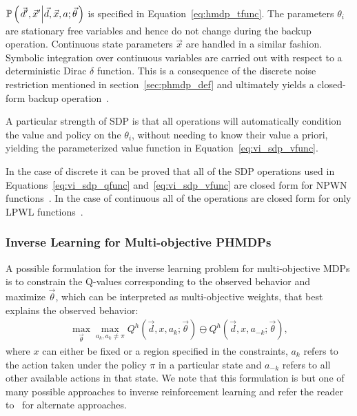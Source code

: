 {\footnotesize $\mathbb{P}\left({\left. \vec{d}', \vec{x}' \middle| \vec{d}, \vec{x}, a; \vec{\theta} \right.}\right)$ } is specified in Equation~\eqref{eq:hmdp_tfunc}. The parameters {\footnotesize $\theta_i$} are stationary free variables and hence do not change during the backup operation. Continuous state parameters {\footnotesize $ \vec{x} $} are handled in a similar fashion. Symbolic integration over continuous variables are carried out with respect to a deterministic Dirac {\footnotesize $\delta$} function. This is a consequence of the discrete noise restriction mentioned in section~\ref{sec:phmdp_def} and ultimately yields a closed-form backup operation~\cite{Sanner_UAI_2011}. 

A particular strength of SDP is that all operations will automatically condition the value and policy on the {\footnotesize $\theta_i$}, without needing to know their value a priori, yielding the parameterized value function in Equation~\eqref{eq:vi_sdp_vfunc}.


In the case of discrete {\footnotesize \Action} it can be proved that all of the SDP operations used in Equations~\eqref{eq:vi_sdp_qfunc} and~\eqref{eq:vi_sdp_vfunc} are closed form for NPWN functions~\cite{Sanner_UAI_2011}. In the case of continuous {\footnotesize \Action} all of the operations are closed form for only LPWL functions~\cite{Zamani_AAAI_2012}.

\subsubsection{Inverse Learning for Multi-objective PHMDPs}

A possible formulation for the inverse learning problem for multi-objective MDPs is to constrain the Q-values corresponding to the observed behavior and maximize {\footnotesize $\vec{\theta}$}, which can be interpreted as multi-objective weights, that best explains the observed behavior: 
\begin{align}
    \label{eq:irl_q}
    \max_{\vec{\theta}} \max_{a_k, a_k \neq \pi } Q^{h} \left(\vec{d}, x, a_k; \vec{\theta} \right) \ominus Q^{h} \left(\vec{d}, x, a_{-k}; \vec{\theta} \right),
\end{align}
where {\footnotesize $ x $} can either be fixed or a region specified in the constraints, {\footnotesize $a_{k}$} refers to the action taken under the policy {\footnotesize $\pi$} in a particular state and {\footnotesize $a_{-k}$} refers to all other available actions in that state. We note that this formulation is but one of many possible approaches to inverse reinforcement learning and refer the reader to~\cite{Ng_ICML_2000} for alternate approaches. 

